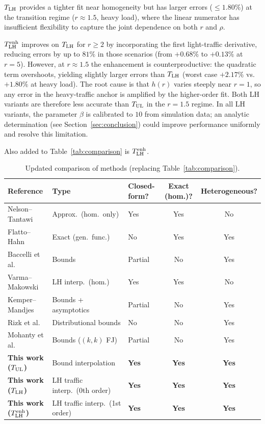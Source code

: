 $T_{\text{LH}}$ provides a tighter fit near homogeneity but has larger errors ($\leq 1.80\%$)
at the transition regime ($r \approx 1.5$, heavy load), where the linear
numerator has insufficient flexibility to capture the joint dependence on
both $r$ and $\rho$.

$T_{\text{LH}}^{\text{enh}}$ improves on $T_{\text{LH}}$ for $r \geq 2$ by incorporating the first
light-traffic derivative, reducing errors by up to $81\%$ in those scenarios
(from $+0.68\%$ to $+0.13\%$ at $r = 5$).
However, at $r \approx 1.5$ the enhancement is counterproductive: the
quadratic term overshoots, yielding slightly larger errors than $T_{\text{LH}}$
(worst case $+2.17\%$ vs.\ $+1.80\%$ at heavy load).
The root cause is that $h(r)$ varies steeply near $r = 1$, so any error in
the heavy-traffic anchor is amplified by the higher-order fit.
Both LH variants are therefore less accurate than $T_{\text{UL}}$ in the $r=1.5$ regime.
In all LH variants, the parameter $\beta$ is calibrated to $10$ from simulation
data; an analytic determination (see Section~\ref{sec:conclusion}) could
improve performance uniformly and resolve this limitation.

Also added to Table~\ref{tab:comparison} is $T_{\text{LH}}^{\text{enh}}$.

\begin{table}[ht]
\centering
\caption{Updated comparison of methods (replacing Table~\ref{tab:comparison}).}
\label{tab:comparison2}
\begin{tabular}{@{}lllcc@{}}
\toprule
Reference & Type & Closed-form? & Exact (hom.)? & Heterogeneous? \\
\midrule
Nelson--Tantawi~\citep{Nelson1988} & Approx.\ (hom.\ only) & Yes & Yes & No \\
Flatto--Hahn~\citep{Flatto1984,Flatto1985} & Exact (gen.\ func.) & No & Yes & Yes \\
Baccelli et al.~\citep{Baccelli1989} & Bounds & Partial & No & Yes \\
Varma--Makowski~\citep{Varma1994} & LH interp.\ (hom.) & Yes & Yes & No \\
Kemper--Mandjes~\citep{Kemper2012} & Bounds + asymptotics & Partial & No & Yes \\
Rizk et al.~\citep{Rizk2015} & Distributional bounds & No & No & Yes \\
Mohanty et al.~\citep{Mohanty2024} & Bounds ($(k,k)$ FJ) & Partial & No & Yes \\
\textbf{This work ($T_{\text{UL}}$)} & Bound interpolation & \textbf{Yes} & \textbf{Yes} & \textbf{Yes} \\
\textbf{This work ($T_{\text{LH}}$)} & LH traffic interp.\ (0th order) & \textbf{Yes} & \textbf{Yes} & \textbf{Yes} \\
\textbf{This work ($T_{\text{LH}}^{\text{enh}}$)} & LH traffic interp.\ (1st order) & \textbf{Yes} & \textbf{Yes} & \textbf{Yes} \\
\bottomrule
\end{tabular}
\end{table}

